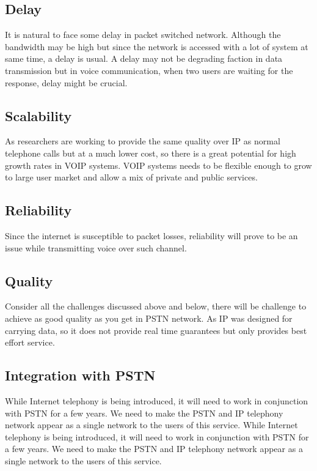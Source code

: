 \documentclass[12pt]{Book}
\begin{document}
    \subsection{Delay}
    It is natural to face some delay in packet switched network. Although the bandwidth may be high but since the network is accessed with a lot of system at same time, a delay is usual. A delay may not be degrading faction in data transmission but in voice communication, when two users are waiting for the response, delay might be crucial. 
    \subsection{Scalability}
    As researchers are working to provide the same quality over IP as normal telephone calls but at a much lower cost,
    so there is a great potential for high growth rates in VOIP systems. VOIP systems needs to be flexible enough to
    grow to large user market and allow a mix of private and public services.
    \subsection{Reliability}
    Since the internet is susceptible to packet losses, reliability will prove to be an issue while transmitting voice over such channel.
    \subsection{Quality}
    Consider all the challenges discussed above and below, there will be challenge to achieve as good quality as you get in PSTN network. As IP was designed for carrying data, so it does not provide real time guarantees but only provides best effort
    service. 
    \subsection{Integration with PSTN}
    While Internet telephony is being introduced, it will need to work in conjunction with PSTN for a few years. We
    need to make the PSTN and IP telephony network appear as a single network to the users of this service.
    While Internet telephony is being introduced, it will need to work in conjunction with PSTN for a few years. We
    need to make the PSTN and IP telephony network appear as a single network to the users of this service.
\end{document}
